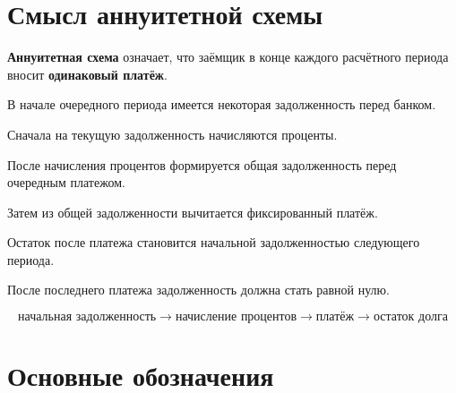 \documentclass[a4paper,12pt]{article}
\newcommand{\term}[1]{\textbf{\color{darkaccent}#1}}
\newcommand{\important}[1]{\textbf{#1}}
\begin{document}

\section{Смысл аннуитетной схемы}

\begin{checklist}
  \item \term{Аннуитетная схема} означает, что заёмщик в конце каждого
  расчётного периода вносит \important{одинаковый платёж}.

  \item В начале очередного периода имеется некоторая задолженность перед
  банком.

  \item Сначала на текущую задолженность начисляются проценты.

  \item После начисления процентов формируется общая задолженность перед
  очередным платежом.

  \item Затем из общей задолженности вычитается фиксированный платёж.

  \item Остаток после платежа становится начальной задолженностью следующего
  периода.

  \item После последнего платежа задолженность должна стать равной нулю.
\end{checklist}

\[
\boxed{
\text{начальная задолженность}
\longrightarrow
\text{начисление процентов}
\longrightarrow
\text{платёж}
\longrightarrow
\text{остаток долга}
}
\]

\section{Основные обозначения}
\end{document}
